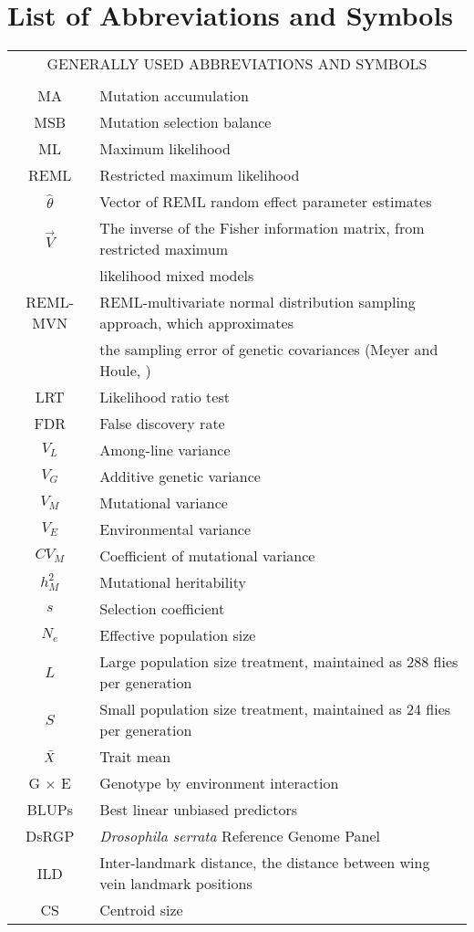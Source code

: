 \chapter{List of Abbreviations and Symbols}

\begin{table}[htp]
\begin{center}
\renewcommand{\arraystretch}{1.3} %
\begin{tabular}{cl}
\multicolumn{2}{c}{\MakeUppercase{Generally used Abbreviations and Symbols}}\\
&\\
MA & Mutation accumulation\\
MSB & Mutation selection balance\\
ML & Maximum likelihood \\
REML & Restricted maximum likelihood \\
$\hat\theta$ & Vector of REML random effect parameter estimates\\
$\vec{V}$ & The inverse of the Fisher information matrix, from restricted maximum \\[-0.8ex]
& likelihood mixed models\\
REML-MVN & REML-multivariate normal distribution sampling approach, which approximates\\[-0.8ex]
& the sampling error of genetic covariances (Meyer and Houle, \citeyear{Meye13,Houl15})\\
LRT & Likelihood ratio test \\
FDR & False discovery rate \\
$V_L$ &  Among-line variance\\
$V_G$ &  Additive genetic variance\\
$V_M$ &  Mutational variance \\
$V_E$ &  Environmental variance\\
$CV_M$ & Coefficient of mutational variance\\
$h_M^2$ & Mutational heritability\\
$s$ & Selection coefficient\\
$N_e$ & Effective population size\\
$L$ & Large population size treatment, maintained as 288 flies per generation\\
$S$ & Small population size treatment, maintained as 24 flies per generation\\
$\Bar{X}$ & Trait mean \\
G $\times$ E & Genotype by environment interaction \\
BLUPs & Best linear unbiased predictors \\
DsRGP & \textit{Drosophila serrata} Reference Genome Panel \\
ILD & Inter-landmark distance, the distance between wing vein landmark positions\\
CS & Centroid size\\

\end{tabular}
\end{center}
\end{table}
